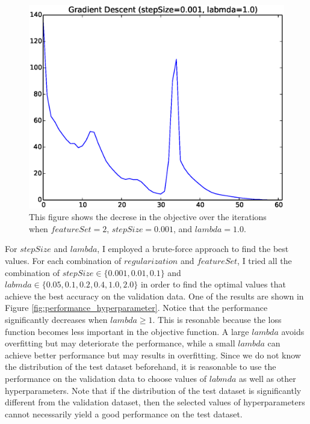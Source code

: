 \begin{figure}[hbtp]
\centering
\includegraphics[width=120mm]{gradient_descent_large_lambda_1}
\caption{This figure shows the decrese in the objective over the iterations when $featureSet=2$, $stepSize=0.001$, and $lambda=1.0$.}
\label{fig:gradient_descent_large_lambda_1}
\end{figure}

For $stepSize$ and $lambda$, I employed a brute-force approach to find the best values. For each combination of $regularization$ and $featureSet$, I tried all the combination of $stepSize \in \{0.001, 0.01, 0.1\}$ and $labmda \in \{0.05, 0.1, 0.2, 0.4, 1.0, 2.0\}$ in order to find the optimal values that achieve the best accuracy on the validation data. One of the results are shown in Figure \ref{fig:performance_hyperparameter}. Notice that the performance significantly decreases when $lambda \ge 1$. This is resonable because the loss function becomes less important in the objective function. A large $lambda$ avoids overfitting but may deteriorate the performance, while a small $lambda$ can achieve better performance but may results in overfitting. Since we do not know the distribution of the test dataset beforehand, it is reasonable to use the performance on the validation data to choose values of $labmda$ as well as other hyperparameters. Note that if the distribution of the test dataset is significantly different from the validation dataset, then the selected values of hyperparameters cannot necessarily yield a good performance on the test dataset.

